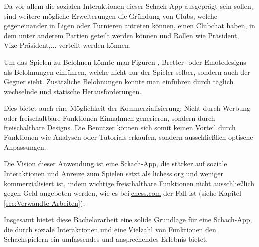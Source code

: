 Da vor allem die sozialen Interaktionen dieser Schach-App ausgeprägt sein sollen, sind weitere mögliche Erweiterungen die Gründung von Clubs, welche gegeneinander in Ligen oder Turnieren antreten können, einen Clubchat haben, in dem unter anderem Partien geteilt werden können und Rollen wie Präsident, Vize-Präsident,... verteilt werden können.
 
Um das Spielen zu Belohnen könnte man Figuren-, Bretter- oder Emotedesigns als Belohnungen einführen, welche nicht nur der Spieler selber, sondern auch der Gegner sieht. Zusätzliche Belohnungen könnte man einführen durch täglich wechselnde und statische Herausforderungen.

Dies bietet auch eine Möglichkeit der Kommerzialisierung: Nicht durch Werbung oder freischaltbare Funktionen Einnahmen generieren, sondern durch freischaltbare Designs. Die Benutzer können sich somit keinen Vorteil durch Funktionen wie Analysen oder Tutorials erkaufen, sondern ausschließlich optische Anpassungen.

Die Vision dieser Anwendung ist eine Schach-App, die stärker auf soziale Interaktionen und Anreize zum Spielen setzt als \url{lichess.org} und weniger kommerzialisiert ist, indem wichtige freischaltbare Funktionen nicht ausschließlich gegen Geld angeboten werden, wie es bei \url{chess.com} der Fall ist (siehe Kapitel \ref{sec:Verwandte Arbeiten}).

Insgesamt bietet diese Bachelorarbeit eine solide Grundlage für eine Schach-App, die durch soziale Interaktionen und eine Vielzahl von Funktionen den Schachspielern ein umfassendes und ansprechendes Erlebnis bietet.